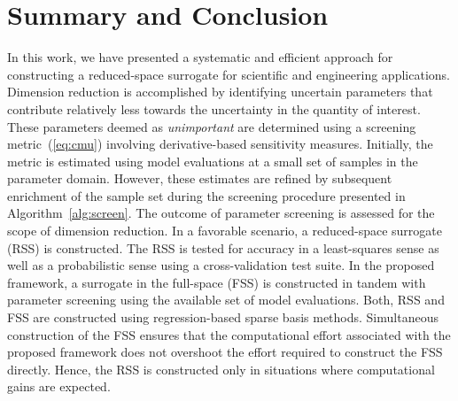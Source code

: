 \section{Summary and Conclusion}
\label{sec:disc}


In this work, we have presented a systematic and efficient approach for constructing
a reduced-space
surrogate for scientific and engineering applications. Dimension reduction is accomplished
by identifying uncertain parameters that contribute relatively less towards the uncertainty
in the quantity of interest. These parameters deemed as \textit{unimportant} are determined
using a screening metric~(\eqref{eq:cmu}) involving derivative-based sensitivity
measures. Initially, the metric is estimated
using model evaluations at a small set of samples in the parameter domain. However, these
estimates are refined by subsequent enrichment of the sample set during the screening
procedure presented in Algorithm~\ref{alg:screen}. The outcome of parameter screening is
assessed for the scope of dimension reduction. In a favorable scenario, a reduced-space
surrogate (RSS) is constructed. The RSS is tested for accuracy in a least-squares sense
as well as a probabilistic sense using a cross-validation test suite. In the proposed framework,
a surrogate in the full-space (FSS) is constructed in tandem with parameter screening using
the available set of model evaluations. Both, RSS and FSS are
constructed using regression-based sparse basis methods. Simultaneous construction
of the FSS ensures that the computational effort associated with the proposed framework
does not overshoot the effort required to construct the FSS directly.
Hence, the RSS is constructed only in situations where computational gains are
expected. 

